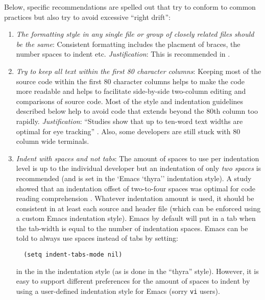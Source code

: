 Below, specific recommendations are spelled out that try to conform to common
practices but also try to avoid excessive ``right drift'':

\begin{enumerate}

{}\item\textit{The formatting style in any single file or group of closely
related files should be the same}: Consistent formatting includes the placment
of braces, the number spaces to indent etc.  {}\textit{Justification}: This is
recommended in {}\cite[Item 0]{C++CodingStandards05}.

{}\item\textit{Try to keep all text within the first 80 character columns}:
Keeping most of the source code within the first 80 character columns helps to
make the code more readable and helps to facilitate side-by-side two-column
editing and comparisons of source code.  Most of the style and indentation
guidelines described below help to avoid code that extends beyond the 80th
column too rapidly. {}\textit{Justification}: ``Studies show that up to
ten-word text widths are optimal for eye tracking'' {}\cite[Item
0]{C++CodingStandards05}.  Also, some developers are still stuck with 80
column wide terminals.

{}\item\textit{Indent with spaces and not tabs}: The amount of spaces to use
per indentation level is up to the individual developer but an indentation of
only {}\textit{two spaces} is recommended (and is set in the `Emacs `thyra''
indentation style).  A study showed that an indentation offset of two-to-four
spaces was optimal for code reading comprehension {}\cite[Section
31.2]{CodeComplete2nd04}.  Whatever indentation amount is used, it should be
consistent in at least each source and header file {}\cite[Item
0]{C++CodingStandards05} (which can be enforced using a custom Emacs
indentation style).  Emacs by default will put in a tab when the tab-width is
equal to the number of indentation spaces.  Emacs can be told to always use
spaces instead of tabs by setting:

{\small\begin{verbatim}
  (setq indent-tabs-mode nil)
\end{verbatim}}

in the in the indentation style (as is done in the ``thyra'' style).  However,
it is easy to support different preferences for the amount of spaces to indent
by using a user-defined indentation style for Emacs (sorry {}\texttt{vi}
users).


\end{enumerate}
